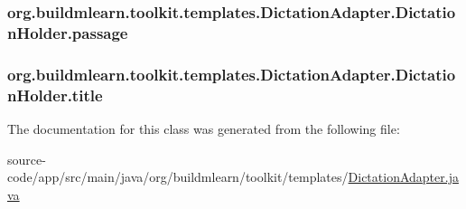 \subsubsection[{\texorpdfstring{passage}{passage}}]{ org.\+buildmlearn.\+toolkit.\+templates.\+Dictation\+Adapter.\+Dictation\+Holder.\+passage}\hypertarget{classorg_1_1buildmlearn_1_1toolkit_1_1templates_1_1DictationAdapter_1_1DictationHolder_ab93b259ad6809a922605040db2a285eb}{}\label{classorg_1_1buildmlearn_1_1toolkit_1_1templates_1_1DictationAdapter_1_1DictationHolder_ab93b259ad6809a922605040db2a285eb}
\subsubsection[{\texorpdfstring{title}{title}}]{ org.\+buildmlearn.\+toolkit.\+templates.\+Dictation\+Adapter.\+Dictation\+Holder.\+title}\hypertarget{classorg_1_1buildmlearn_1_1toolkit_1_1templates_1_1DictationAdapter_1_1DictationHolder_a92bd6c2566c45fb1ac95bbc0c2cd53f8}{}\label{classorg_1_1buildmlearn_1_1toolkit_1_1templates_1_1DictationAdapter_1_1DictationHolder_a92bd6c2566c45fb1ac95bbc0c2cd53f8}


The documentation for this class was generated from the following file\+:\begin{DoxyCompactItemize}
\item 
source-\/code/app/src/main/java/org/buildmlearn/toolkit/templates/\hyperlink{DictationAdapter_8java}{Dictation\+Adapter.\+java}\end{DoxyCompactItemize}
